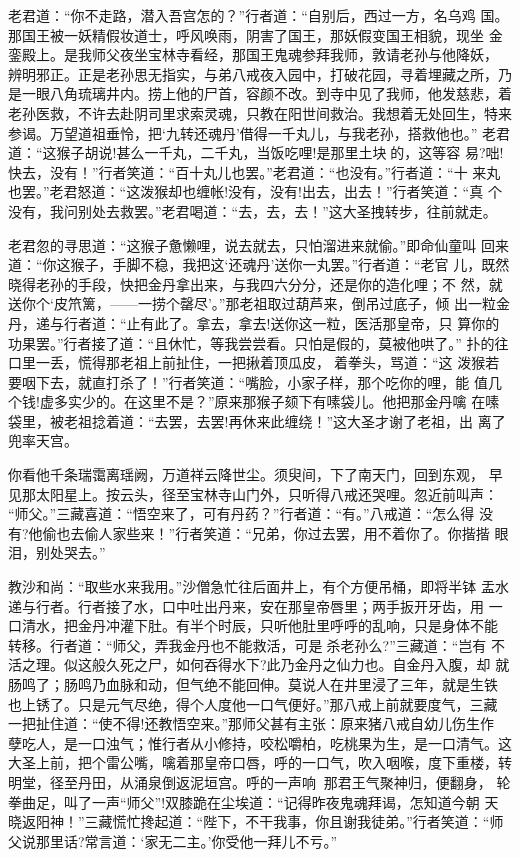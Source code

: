 老君道：“你不走路，潜入吾宫怎的？”行者道：“自别后，西过一方，名乌鸡
国。那国王被一妖精假妆道士，呼风唤雨，阴害了国王，那妖假变国王相貌，现坐
金銮殿上。是我师父夜坐宝林寺看经，那国王鬼魂参拜我师，敦请老孙与他降妖，
辨明邪正。正是老孙思无指实，与弟八戒夜入园中，打破花园，寻着埋藏之所，乃
是一眼八角琉璃井内。捞上他的尸首，容颜不改。到寺中见了我师，他发慈悲，着
老孙医救，不许去赴阴司里求索灵魂，只教在阳世间救治。我想着无处回生，特来
参谒。万望道祖垂怜，把‘九转还魂丹’借得一千丸儿，与我老孙，搭救他也。”
老君道：“这猴子胡说!甚么一千丸，二千丸，当饭吃哩!是那里土块的，这等容
易?咄!快去，没有！”行者笑道：“百十丸儿也罢。”老君道：“也没有。”行者道：“十
来丸也罢。”老君怒道：“这泼猴却也缠帐!没有，没有!出去，出去！”行者笑道：“真
个没有，我问别处去救罢。”老君喝道：“去，去，去！”这大圣拽转步，往前就走。

老君忽的寻思道：“这猴子惫懒哩，说去就去，只怕溜进来就偷。”即命仙童叫
回来道：“你这猴子，手脚不稳，我把这‘还魂丹’送你一丸罢。”行者道：“老官
儿，既然晓得老孙的手段，快把金丹拿出来，与我四六分分，还是你的造化哩；不
然，就送你个‘皮笊篱，——一捞个罄尽’。”那老祖取过葫芦来，倒吊过底子，倾
出一粒金丹，递与行者道：“止有此了。拿去，拿去!送你这一粒，医活那皇帝，只
算你的功果罢。”行者接了道：“且休忙，等我尝尝看。只怕是假的，莫被他哄了。”
扑的往口里一丢，慌得那老祖上前扯住，一把揪着顶瓜皮，着拳头，骂道：“这
泼猴若要咽下去，就直打杀了！”行者笑道：“嘴脸，小家子样，那个吃你的哩，能
值几个钱!虚多实少的。在这里不是？”原来那猴子颏下有嗉袋儿。他把那金丹噙
在嗉袋里，被老祖捻着道：“去罢，去罢!再休来此缠绕！”这大圣才谢了老祖，出
离了兜率天宫。

你看他千条瑞霭离瑶阙，万道祥云降世尘。须臾间，下了南天门，回到东观，
早见那太阳星上。按云头，径至宝林寺山门外，只听得八戒还哭哩。忽近前叫声：
“师父。”三藏喜道：“悟空来了，可有丹药？”行者道：“有。”八戒道：“怎么得
没有?他偷也去偷人家些来！”行者笑道：“兄弟，你过去罢，用不着你了。你揩揩
眼泪，别处哭去。”

教沙和尚：“取些水来我用。”沙僧急忙往后面井上，有个方便吊桶，即将半钵
盂水递与行者。行者接了水，口中吐出丹来，安在那皇帝唇里；两手扳开牙齿，用
一口清水，把金丹冲灌下肚。有半个时辰，只听他肚里呼呼的乱响，只是身体不能
转移。行者道：“师父，弄我金丹也不能救活，可是杀老孙么?”三藏道：“岂有
不活之理。似这般久死之尸，如何吞得水下?此乃金丹之仙力也。自金丹入腹，却
就肠鸣了；肠鸣乃血脉和动，但气绝不能回伸。莫说人在井里浸了三年，就是生铁
也上锈了。只是元气尽绝，得个人度他一口气便好。”那八戒上前就要度气，三藏
一把扯住道：“使不得!还教悟空来。”那师父甚有主张：原来猪八戒自幼儿伤生作
孽吃人，是一口浊气；惟行者从小修持，咬松嚼柏，吃桃果为生，是一口清气。这
大圣上前，把个雷公嘴，噙着那皇帝口唇，呼的一口气，吹入咽喉，度下重楼，转
明堂，径至丹田，从涌泉倒返泥垣宫。呼的一声响，那君王气聚神归，便翻身，
轮拳曲足，叫了一声“师父”!双膝跪在尘埃道：“记得昨夜鬼魂拜谒，怎知道今朝
天晓返阳神！”三藏慌忙搀起道：“陛下，不干我事，你且谢我徒弟。”行者笑道：“师
父说那里话?常言道：‘家无二主。’你受他一拜儿不亏。”

